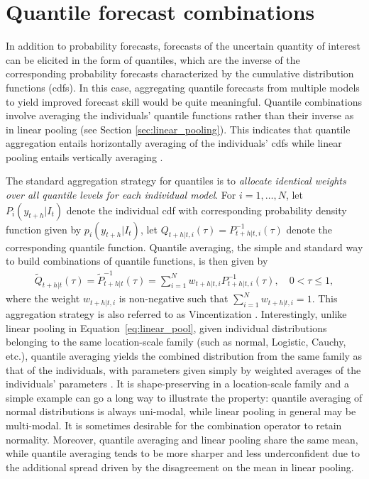 \documentclass[11pt]{article}
\begin{document}
\section{Quantile forecast combinations}
\label{sec:quantile_comb}

In addition to probability forecasts, forecasts of the uncertain quantity of interest can be elicited in the form of quantiles, which are the inverse of the corresponding probability forecasts characterized by the cumulative distribution functions (cdfs). In this case, aggregating quantile forecasts from multiple models to yield improved forecast skill would be quite meaningful. Quantile combinations involve averaging the individuals' quantile functions rather than their inverse as in linear pooling (see Section \ref{sec:linear_pooling}). This indicates that quantile aggregation entails horizontally averaging of the individuals' cdfs while linear pooling entails vertically averaging \citep{Lichtendahl2013-rt}.

The standard aggregation strategy for quantiles is to \textit{allocate identical weights over all quantile levels for each individual model}. For $i=1,\ldots,N$, let $P_{i}(y_{t+h}|I_{t})$ denote the individual cdf with corresponding probability density function given by $p_{i}(y_{t+h}|I_{t})$, let $Q_{t+h|t,i}(\tau) = P_{t+h|t,i}^{-1}(\tau)$ denote the corresponding quantile function. Quantile averaging, the simple and standard way to build combinations of quantile functions, is then given by
\begin{align}
\label{eq:quantile_avg}
\tilde{Q}_{t+h|t}(\tau) = \tilde{P}_{t+h|t}^{-1}(\tau) = \sum_{i=1}^{N} w_{t+h|t,i} P_{t+h|t,i}^{-1}(\tau), \quad 0 < \tau \leq 1,
\end{align}
where the weight $w_{t+h|t,i}$ is non-negative such that $\sum_{i=1}^{N}w_{t+h|t,i}=1$. This aggregation strategy is also referred to as Vincentization \citep{vincent1912-fu}. Interestingly, unlike linear pooling in Equation~\eqref{eq:linear_pool}, given individual distributions belonging to the same location-scale family (such as normal, Logistic, Cauchy, etc.), quantile averaging yields the combined distribution from the same family as that of the individuals, with parameters given simply by weighted averages of the individuals' parameters \citep{Ratcliff1979-cb,Thomas1980-lp}. It is shape-preserving in a location-scale family and a simple example can go a long way to illustrate the property: quantile averaging of normal distributions is always uni-modal, while linear pooling in general may be multi-modal. It is sometimes desirable for the combination operator to retain normality. Moreover, quantile averaging and linear pooling share the same mean, while quantile averaging tends to be more sharper and less underconfident due to the additional spread driven by the disagreement on the mean in linear pooling.
\end{document}
